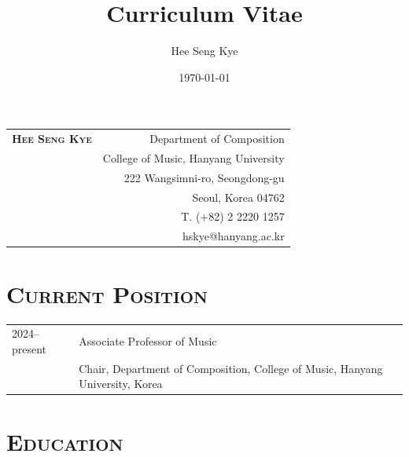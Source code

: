 \documentclass[a4paper,11pt,draft]{article}
\title{Curriculum Vitae}
\author{Hee Seng Kye}
\date{\today}
\begin{document}
  \renewcommand{\headrulewidth}{0pt}
  \fancyhf{}
  \fancyfoot[RE,RO]{\small \thepage}
  
  \raggedright \parindent=15pt
  
  \hspace*{-0.8cm}
  \begin{tabular}{p{9.72cm} r}
    {\Large \textsc{\textbf{Hee Seng Kye}}} & Department of Composition\\
    & College of Music, Hanyang University\\
    & 222 Wangsimni-ro, Seongdong-gu\\
    & Seoul, Korea 04762\\
    & T. (+82) 2 2220 1257\\
    & hskye@hanyang.ac.kr
  \end{tabular}
  
  \vspace{10mm}
  
  \section*{\textsc{Current Position}}
  
  \hspace*{-0.25cm}
  \begin{tabular}{p{2.5cm} l}
    2024--present & Associate Professor of Music\\
    & Chair, Department of Composition, College of Music, Hanyang University, Korea
  \end{tabular}
  
  \vspace*{5mm}
  
  \section*{\textsc{Education}}
  
\end{document}
